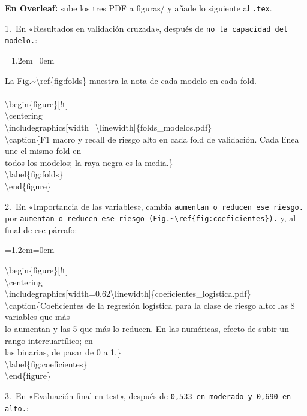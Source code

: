 \documentclass[11pt,a4paper]{article}
\newenvironment{codigo}
  {\par\smallskip\begin{list}{}{\leftmargin=1.2em\rightmargin=0em}\item\relax\ttfamily\scriptsize\raggedright}
  {\end{list}\smallskip}
\begin{document}
{\textbf{En Overleaf:} sube los tres PDF a figuras/\allowbreak{} y añade lo siguiente al \texttt{.tex}.

\hspace*{1.0em}1.~En «Resultados en validación cruzada», después de \texttt{no la capacidad del modelo.}:

\begin{codigo}
La Fig.\textasciitilde{}\textbackslash\allowbreak{}ref\{fig:folds\} muestra la nota de cada modelo en cada fold. \\{}
\mbox{} \\{}
\textbackslash\allowbreak{}begin\{figure\}[!t] \\{}
\textbackslash\allowbreak{}centering \\{}
\textbackslash\allowbreak{}includegraphics[width=\textbackslash\allowbreak{}linewidth]\{folds\_\allowbreak{}modelos.pdf\} \\{}
\textbackslash\allowbreak{}caption\{F1 macro y recall de riesgo alto en cada fold de validación. Cada línea une el mismo fold en \\{}
todos los modelos; la raya negra es la media.\} \\{}
\textbackslash\allowbreak{}label\{fig:folds\} \\{}
\textbackslash\allowbreak{}end\{figure\}
\end{codigo}
\hspace*{1.0em}2.~En «Importancia de las variables», cambia \texttt{aumentan o reducen ese riesgo.} por \texttt{aumentan o reducen ese riesgo (Fig.\textasciitilde{}\textbackslash\allowbreak{}ref\{fig:coeficientes\}).} y, al final de ese párrafo:

\begin{codigo}
\textbackslash\allowbreak{}begin\{figure\}[!t] \\{}
\textbackslash\allowbreak{}centering \\{}
\textbackslash\allowbreak{}includegraphics[width=0.62\textbackslash\allowbreak{}linewidth]\{coeficientes\_\allowbreak{}logistica.pdf\} \\{}
\textbackslash\allowbreak{}caption\{Coeficientes de la regresión logística para la clase de riesgo alto: las 8 variables que más \\{}
lo aumentan y las 5 que más lo reducen. En las numéricas, efecto de subir un rango intercuartílico; en \\{}
las binarias, de pasar de 0 a 1.\} \\{}
\textbackslash\allowbreak{}label\{fig:coeficientes\} \\{}
\textbackslash\allowbreak{}end\{figure\}
\end{codigo}
\hspace*{1.0em}3.~En «Evaluación final en test», después de \texttt{0,533 en moderado y 0,690 en alto.}:

}
\end{document}
